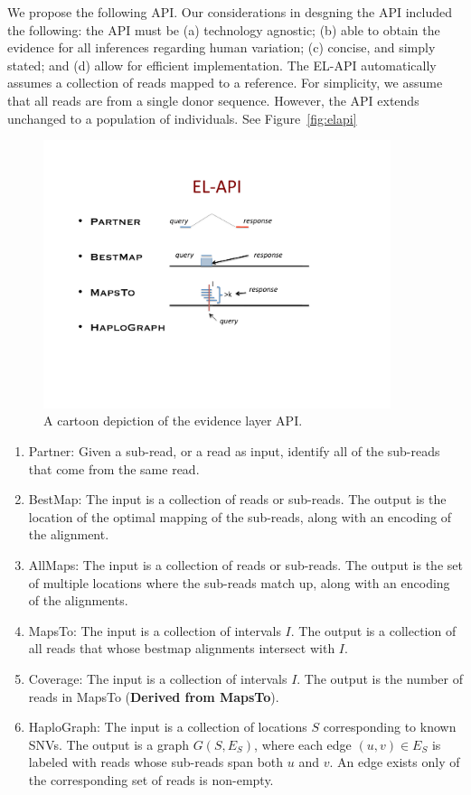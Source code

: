 \documentclass[11pt]{article}
\begin{document}
We propose the following API. Our considerations in desgning the API
included the following: the API must be (a) technology agnostic; (b)
able to obtain the evidence for all inferences regarding human
variation; (c) concise, and simply stated; and (d) allow for efficient
implementation. The EL-API automatically assumes a collection of reads
mapped to a reference. For simplicity, we assume that all reads are
from a single donor sequence. However, the API extends unchanged to a
population of individuals. See Figure~\ref{fig:elapi}
\begin{figure}[ht]
  \centering
  \includegraphics[trim = 25mm 50mm 40mm 20mm, clip, width=4in]{fig/ELAPI.pdf}
  \caption{A cartoon depiction of the evidence layer API.}
  \label{fig:el_api}
\end{figure}
\begin{enumerate}
\item {\sc Partner:} Given a sub-read, or a read as input, identify
  all of the sub-reads that come from the same read.
\item {\sc BestMap:} The input is a collection of reads or
  sub-reads. The output is the location of the optimal mapping of the
  sub-reads, along with an encoding of the alignment.
\item {\sc AllMaps:} The input is a collection of reads or
  sub-reads. The output is the set of multiple locations where the
  sub-reads match up, along with an encoding of the alignments.
\item {\sc MapsTo:} The input is a collection of intervals $I$. The
  output is a collection of all reads that whose bestmap alignments
  intersect with $I$.
\item {\sc Coverage:} The input is a collection of intervals $I$. The
  output is the number of reads in {\sc MapsTo} ({\bf Derived from
    MapsTo}).
\item {\sc HaploGraph:} The input is a collection of locations $S$
  corresponding to known SNVs. The output is a graph $G(S,E_S)$, where
  each edge $(u,v)\in E_S$ is labeled with reads whose sub-reads span
  both $u$ and $v$. An edge exists only of the corresponding set of
  reads is non-empty.

\end{enumerate}
\end{document}
